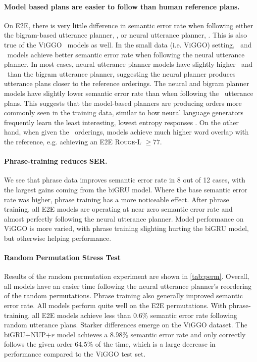 \paragraph{Model based plans are easier to follow than human reference plans.
} On E2E, there is very little difference in semantic error rate when following either the
bigram-based utterance planner, \BgUP, or neural utterance planner,
\NUP. This is also true of the ViGGO \BART~models as well.  In the
small data (i.e. ViGGO) setting, \biGRU~and \Transformer~models achieve better semantic error rate when following the neural utterance planner.  In most cases,
neural utterance planner models have slightly higher \bleu~and \rougel~than
the bigram utterance planner, suggesting the neural planner produces utterance plans closer to
the reference orderings. The neural and bigram planner models have slightly lower semantic error rate
than when following the \Oracle~utterance plans.  This suggests that the model-based planners
are producing orders more commonly seen in the training data, similar to how
neural language generators frequently learn the least interesting, lowest
entropy responses \citep{serban2016}.  On the other hand, when given
the \Oracle~orderings, models achieve much higher word overlap with the
reference, e.g. achieving an E2E \textsc{Rouge-L} $\ge 77$.



\paragraph{Phrase-training reduces SER.} We see that phrase data improves semantic error rate
in 8 out of 12 cases, with the largest gains coming from the biGRU
 model.  Where the base semantic error rate was higher, phrase training has a more
noticeable effect. After phrase training, all E2E models are operating at near
zero semantic error rate and almost perfectly following the neural utterance planner. Model performance on ViGGO
is more varied, with phrase training slighting hurting the biGRU
 model, but otherwise helping performance.

\paragraph{Random Permutation Stress Test} Results of the random permutation
experiment are shown in \autoref{tab:perm}.  Overall, all models have an
easier time following the neural utterance planner's reordering of
the random
permutations. Phrase training also generally improved semantic error rate.  All models perform
quite well on the E2E permutations.  
With phrase-training,
all E2E models achieve less than 0.6\% semantic error rate following random 
utterance plans.
Starker differences emerge on the ViGGO dataset.  The biGRU\textsc{+NUP+p} model
achieves a 8.98\% semantic error rate and only correctly follows the given 
order 64.5\% of
the time, which is a large decrease in performance compared to the ViGGO test set.%

